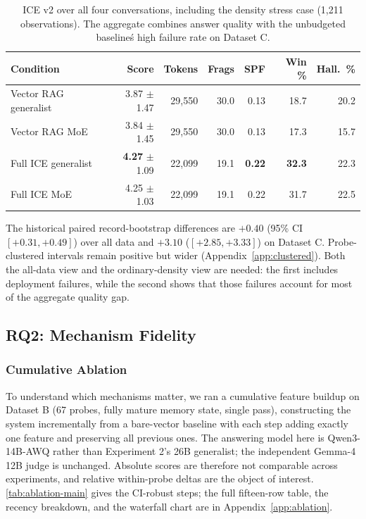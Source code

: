 \documentclass[twoside,11pt]{article}
\begin{document}
\begin{table}[tbp]
\centering
\small


\begin{tabular}{@{}lrrrrrr@{}}
\toprule
\textbf{Condition} & \textbf{Score} & \textbf{Tokens} & \textbf{Frags} & \textbf{SPF} & \textbf{Win \%} & \textbf{Hall.\ \%} \\
\midrule
Vector RAG generalist & 3.87 $\pm$ 1.47 & 29{,}550 & 30.0 & 0.13 & 18.7 & 20.2 \\
Vector RAG MoE        & 3.84 $\pm$ 1.45 & 29{,}550 & 30.0 & 0.13 & 17.3 & 15.7 \\
Full ICE generalist   & \textbf{4.27} $\pm$ 1.09 & 22{,}099 & 19.1 & \textbf{0.22} & \textbf{32.3} & 22.3 \\
Full ICE MoE          & 4.25 $\pm$ 1.03 & 22{,}099 & 19.1 & 0.22 & 31.7 & 22.5 \\
\bottomrule
\end{tabular}
\caption{ICE v2 over all four conversations, including the density stress case (1,211 observations). The aggregate combines answer quality with the unbudgeted baseline\'s high failure rate on Dataset C.}
\label{tab:exp2-alldata}
\end{table}

The historical paired record-bootstrap differences are $+0.40$ (95\% CI $[+0.31,+0.49]$) over all data and $+3.10$ ($[+2.85,+3.33]$) on Dataset C. Probe-clustered intervals remain positive but wider (Appendix~\ref{app:clustered}). Both the all-data view and the ordinary-density view are needed: the first includes deployment failures, while the second shows that those failures account for most of the aggregate quality gap.

\subsection{RQ2: Mechanism Fidelity}
\subsubsection{Cumulative Ablation}
\label{sec:ablation}

To understand which mechanisms matter, we ran a cumulative feature buildup on Dataset B (67 probes, fully mature memory state, single pass), constructing the system incrementally from a bare-vector baseline with each step adding exactly one feature and preserving all previous ones. The answering model here is Qwen3-14B-AWQ rather than Experiment 2's 26B generalist; the independent Gemma-4 12B judge is unchanged. Absolute scores are therefore not comparable across experiments, and relative within-probe deltas are the object of interest. \cref{tab:ablation-main} gives the CI-robust steps; the full fifteen-row table, the recency breakdown, and the waterfall chart are in Appendix~\ref{app:ablation}.
\end{document}
